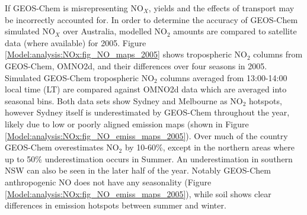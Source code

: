     If GEOS-Chem is misrepresenting NO$_X$, yields and the effects of transport may be incorrectly accounted for.
    In order to determine the accuracy of GEOS-Chem simulated NO$_X$ over Australia, modelled NO$_2$ amounts are compared to satellite data (where available) for 2005.
    Figure \ref{Model:analysis:NOx:fig_NO_maps_2005} shows tropospheric NO$_2$ columns from GEOS-Chem, OMNO2d, and their differences over four seasons in 2005.
    Simulated GEOS-Chem tropospheric NO$_2$ columns averaged from 13:00-14:00 local time (LT) are compared against OMNO2d data which are averaged into seasonal \lowhr bins. %
    Both data sets show Sydney and Melbourne as NO$_2$ hotspots, however Sydney itself is underestimated by GEOS-Chem throughout the year, likely due to low or poorly aligned emission maps (shown in Figure \ref{Model:analysis:NOx:fig_NO_emiss_maps_2005}).
    Over much of the country GEOS-Chem overestimates NO$_2$ by 10-60\%, except in the northern areas where up to 50\% underestimation occurs in Summer.
    An underestimation in southern NSW can also be seen in the later half of the year.
    Notably GEOS-Chem anthropogenic NO does not have any seasonality (Figure \ref{Model:analysis:NOx:fig_NO_emiss_maps_2005}), while soil shows clear differences in emission hotspots between summer and winter.
      
    
    
